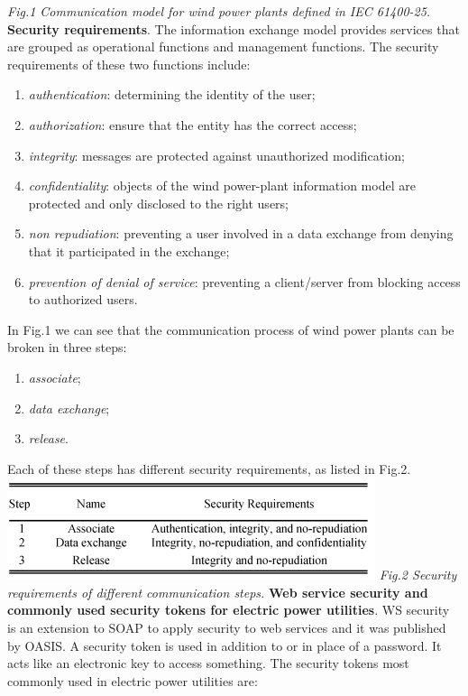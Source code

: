 \documentclass[twosided,a4,10pt]{article}
\begin{document}
\begin{multicols}{2}
  	\textit{Fig.1 Communication model for wind power plants defined in IEC 61400-25.} \newline
  	\textbf{Security requirements}.\newline
  	The information exchange model provides services that are grouped as operational functions and management functions. The security requirements of these two functions include:
  	\begin{enumerate}
  		\item \textit{authentication}: determining the identity of the user;
  		\item \textit{authorization}: ensure that the entity has the correct access;
  		\item \textit{integrity}: messages are protected against unauthorized modification;
  		\item \textit{confidentiality}: objects of the wind power-plant information model are protected and only disclosed to the right users;
  		\item \textit{non repudiation}: preventing a user involved in a data exchange from denying that it participated in the exchange;
  		\item \textit{prevention of denial of service}: preventing a client/server from blocking access to authorized users.
  	\end{enumerate}	
  	In Fig.1 we can see that the communication process of wind power plants can be broken in three steps:
  	\begin{enumerate}
  		\item \textit{associate};
  		\item \textit{data exchange};
  		\item \textit{release}.
  	\end{enumerate}
  	Each of these steps has different security requirements, as listed in Fig.2.	
  	\includegraphics[scale=0.65]{securityRequirements.png}
  	\textit{Fig.2 Security requirements of different communication steps.} \newline	
  	\textbf{Web service security and commonly used security tokens for electric power utilities}. \newline
  	WS security is an extension to SOAP to apply security to web services and it was published by OASIS. A security token is used in addition to or in place of a password. It acts like an electronic key to access something. The security tokens most commonly used in electric power utilities are:

\end{multicols}
\end{document}

